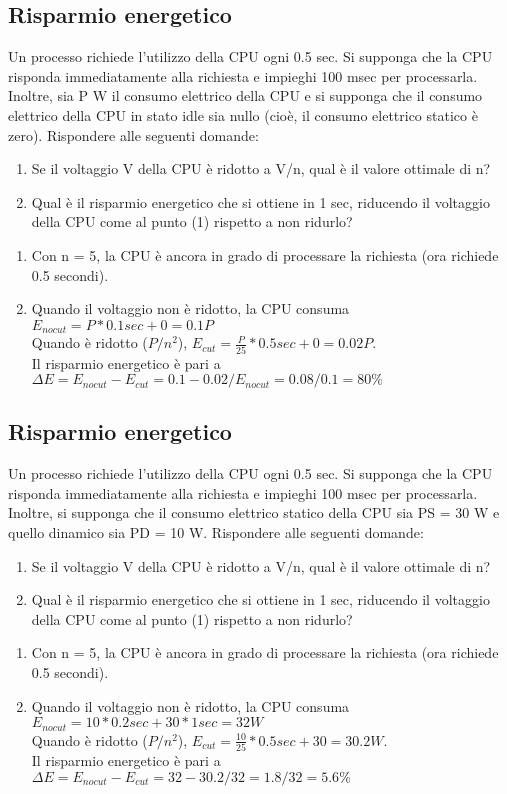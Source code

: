 \documentclass[12pt]{article}
\begin{document}
\subsection{Risparmio energetico}
Un processo richiede l'utilizzo della CPU ogni 0.5 sec. Si supponga che la CPU risponda
immediatamente alla richiesta e impieghi 100 msec per processarla. Inoltre, sia P W il consumo
elettrico della CPU e si supponga che il consumo elettrico della CPU in stato idle sia nullo (cioè, il
consumo elettrico statico è zero). Rispondere alle seguenti domande:
\begin{enumerate}
    \item Se il voltaggio V della CPU è ridotto a V/n, qual è il valore ottimale di n?
    \item Qual è il risparmio energetico che si ottiene in 1 sec, riducendo il voltaggio della CPU come al punto (1) rispetto a non ridurlo?
\end{enumerate}
\begin{enumerate}
    \color{blue}
    \item Con n = 5, la CPU è ancora in grado di processare la richiesta (ora richiede 0.5 secondi).
    \item Quando il voltaggio non è ridotto, la CPU consuma $E_{nocut} = P * 0.1 sec + 0 = 0.1 P$\\ Quando è ridotto ($P/n^2$), $E_{cut} = \frac{P}{25} * 0.5 sec + 0 = 0.02P$.\\
    Il risparmio energetico è pari a $\Delta E = E_{nocut} - E_{cut} = 0.1 - 0.02 / E_{nocut }= 0.08 / 0.1 = 80 \%$
\end{enumerate}
\subsection{Risparmio energetico}
Un processo richiede l'utilizzo della CPU ogni 0.5 sec. Si supponga che la CPU risponda
immediatamente alla richiesta e impieghi 100 msec per processarla. Inoltre, si supponga che il
consumo elettrico statico della CPU sia PS = 30 W e quello dinamico sia PD = 10 W. Rispondere alle
seguenti domande:
\begin{enumerate}
    \item Se il voltaggio V della CPU è ridotto a V/n, qual è il valore ottimale di n?
    \item Qual è il risparmio energetico che si ottiene in 1 sec, riducendo il voltaggio della CPU come al punto (1) rispetto a non ridurlo?
\end{enumerate}
\begin{enumerate}
    \color{blue}
    \item Con n = 5, la CPU è ancora in grado di processare la richiesta (ora richiede 0.5 secondi).
    \item Quando il voltaggio non è ridotto, la CPU consuma $E_{nocut} = 10 * 0.2 sec + 30*1 sec = 32 W$\\ Quando è ridotto ($P/n^2$), $E_{cut} = \frac{10}{25} * 0.5 sec + 30 = 30.2 W$.\\
    Il risparmio energetico è pari a $\Delta E = E_{nocut} - E_{cut} = 32 - 30.2 / 32 = 1.8 / 32 = 5.6 \%$
\end{enumerate}
\end{document}

